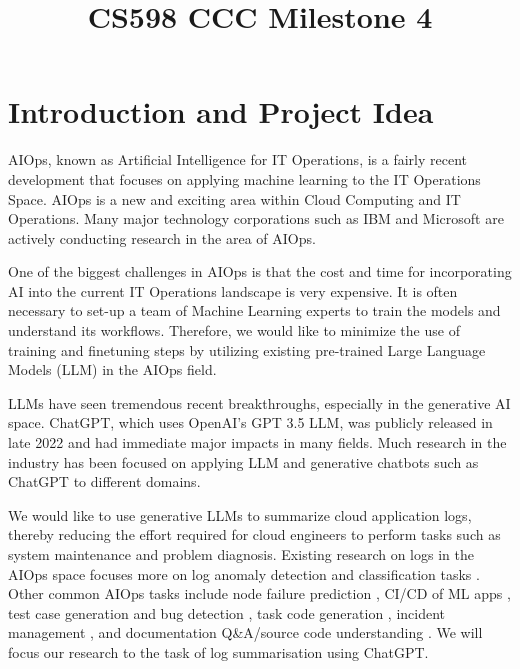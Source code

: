 \documentclass[conference]{IEEEtran}
\begin{document}
\title{CS598 CCC Milestone 4\\
}

\author{
\and
{}
\and
{}
}
\maketitle


\section{Introduction and Project Idea}

AIOps, known as Artificial Intelligence for IT Operations, is a fairly recent development that focuses on applying machine learning to the IT Operations Space. AIOps is a new and exciting area within Cloud Computing and IT Operations. \cite{10212414, 10199929} Many major technology corporations such as IBM and Microsoft \cite{li2022an}  are actively conducting research in the area of AIOps. \cite{aiops-challenges} 

One of the biggest challenges in AIOps is that the cost and time for incorporating AI into the current IT Operations landscape is very expensive. It is often necessary to set-up a team of Machine Learning experts to train the models and understand its workflows. Therefore, we would like to minimize the use of training and finetuning steps by utilizing existing pre-trained Large Language Models (LLM) in the AIOps field.

LLMs have seen tremendous recent breakthroughs, especially in the generative AI space. ChatGPT, which uses OpenAI's GPT 3.5 LLM, was publicly released in late 2022 and had immediate major impacts in many fields. Much research in the industry has been focused on applying LLM and generative chatbots such as ChatGPT to different domains. 

We would like to use generative LLMs to summarize cloud application logs, thereby reducing the effort required for cloud engineers to perform tasks such as system maintenance and problem diagnosis. Existing research on logs in the AIOps space focuses more on log anomaly detection and classification tasks \cite{network-log-anomaly-detection}. Other common AIOps tasks include node failure prediction \cite{aiops-node-failures-alibaba}, CI/CD of ML apps \cite{mlops-ossara}, test case generation and bug detection \cite{model-checking-guided-testing}, task code generation \cite{mani2023enhancing}, incident management \cite{chen2020aiops, li2022an}, and documentation Q\&A/source code understanding \cite{source-code-understanding}. We will focus our research to the task of log summarisation using ChatGPT.
\end{document}
